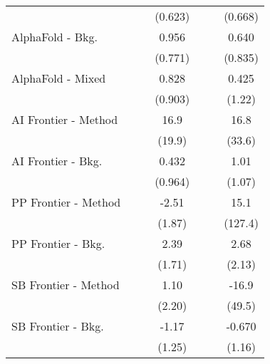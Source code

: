 \begin{tabular}{lcccccc}
                                  &              &             & (0.623)      &              &         & (0.668)\\   
   AlphaFold - Bkg.               &              &             & 0.956        &              &         & 0.640\\   
                                  &              &             & (0.771)      &              &         & (0.835)\\   
   AlphaFold - Mixed              &              &             & 0.828        &              &         & 0.425\\   
                                  &              &             & (0.903)      &              &         & (1.22)\\   
   AI Frontier - Method           &              &             & 16.9         &              &         & 16.8\\   
                                  &              &             & (19.9)       &              &         & (33.6)\\   
   AI Frontier - Bkg.             &              &             & 0.432        &              &         & 1.01\\   
                                  &              &             & (0.964)      &              &         & (1.07)\\   
   PP Frontier - Method           &              &             & -2.51        &              &         & 15.1\\   
                                  &              &             & (1.87)       &              &         & (127.4)\\   
   PP Frontier - Bkg.             &              &             & 2.39         &              &         & 2.68\\   
                                  &              &             & (1.71)       &              &         & (2.13)\\   
   SB Frontier - Method           &              &             & 1.10         &              &         & -16.9\\   
                                  &              &             & (2.20)       &              &         & (49.5)\\   
   SB Frontier - Bkg.             &              &             & -1.17        &              &         & -0.670\\   
                                  &              &             & (1.25)       &              &         & (1.16)\\   

\end{tabular}
